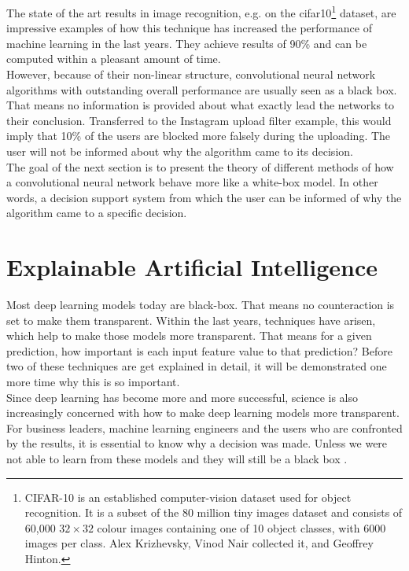 The state of the art results in image recognition, e.g. on the cifar10\footnote{CIFAR-10  is an established computer-vision dataset used for object recognition. It is a subset of the 80 million tiny images dataset and consists of 60,000 \( 32 \times 32\) colour images containing one of 10 object classes, with 6000 images per class. Alex Krizhevsky, Vinod Nair collected it, and Geoffrey Hinton.} dataset, are impressive examples of how this technique has increased the performance of machine learning in the last years. They achieve results of 90\% and can be computed within a pleasant amount of time.\\

However, because of their non-linear structure, convolutional neural network algorithms with outstanding overall performance are usually seen as a black box. That means no information is provided about what exactly lead the networks to their conclusion. Transferred to the Instagram upload filter example, this would imply that 10\% of the users are blocked more falsely during the uploading.  The user will not be informed about why the algorithm came to its decision.\\

The goal of the next section is to present the theory of different methods of how a convolutional neural network behave more like a white-box model. In other words, a decision support system from which the user can be informed of why the algorithm came to a specific decision.

\section{Explainable Artificial Intelligence}
Most deep learning models today are black-box. That means no counteraction is set to make them transparent. Within the last years, techniques have arisen, which help to make those models more transparent. That means for a given prediction, how important is each input feature value to that prediction? Before two of these techniques are get explained in detail, it will be demonstrated one more time why this is so important.\\

Since deep learning has become more and more successful, science is also increasingly concerned with how to make deep learning models more transparent. For business leaders, machine learning engineers and the users who are confronted by the results, it is essential to know why a decision was made. Unless we were not able to learn from these models and they will still be a black box \cite{MichaelJordan2018} \cite{Kuang2017}.\\

